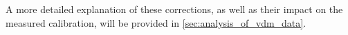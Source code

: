 A more detailed explanation of these corrections, as well as their impact on the measured calibration, will be provided in \autoref{sec:analysis_of_vdm_data}.








